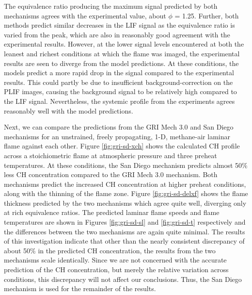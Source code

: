 

The equivalence ratio producing the maximum signal predicted by both mechanisms agrees with the experimental value, about \(\phi\) = 1.25.
Further, both methods predict similar decreases in the LIF signal as the equivalence ratio is varied from the peak, which are also in reasonably good agreement with the experimental results.
However, at the lower signal levels encountered at both the leanest and richest conditions at which the flame was imaged, the experimental results are seen to diverge from the model predictions.
At these conditions, the models predict a more rapid drop in the signal compared to the experimental results.
This could partly be due to insufficient background-correction on the PLIF images, causing the background signal to be relatively high compared to the LIF signal.
Nevertheless, the systemic profile from the experiments agrees reasonably well with the model predictions.

Next, we can compare the predictions from the GRI Mech 3.0 and San Diego mechanisms for an unstrained, freely propagating, 1-D, methane-air laminar flame against each other.
Figure \ref{fig:gri-sd-xch} shows the calculated CH profile across a stoichiometric flame at atmospheric pressure and three preheat temperatures.
At these conditions, the San Diego mechanism predicts almost 50\% less CH concentration compared to the GRI Mech 3.0 mechanism.
Both mechanisms predict the increased CH concentration at higher preheat conditions, along with the thinning of the flame zone.
Figure \ref{fig:gri-sd-delxf} shows the flame thickness predicted by the two mechanisms which agree quite well, diverging only at rich equivalence ratios.
The predicted laminar flame speeds and flame temperatures are shown in Figures \ref{fig:gri-sd-sl} and \ref{fig:gri-sd-t} respectively and the differences between the two mechanisms are again quite minimal.
The results of this investigation indicate that other than the nearly consistent discrepancy of about 50\% in the predicted CH concentration, the results from the two mechanisms scale identically.
Since we are not concerned with the accurate prediction of the CH concentration, but merely the relative variation across conditions, this discrepancy will not affect our conclusions.
Thus, the San Diego mechanism is used for the remainder of the results.



